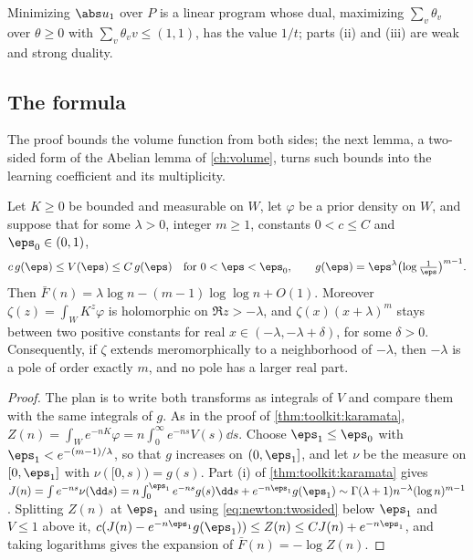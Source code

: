 \begin{refsection}
Minimizing $\abs u_1$ over $P$ is a linear program whose dual, maximizing $\sum_v\theta_v$ over $\theta\ge0$ with $\sum_v\theta_vv\le(1,1)$, has the value $1/t$; parts (ii) and (iii) are weak and strong duality.

\subsection{The formula}

The proof bounds the volume function from both sides; the next lemma, a two-sided form of the Abelian lemma of \cref{ch:volume}, turns such bounds into the learning coefficient and its multiplicity.

\begin{lemma}\label{lem:newton:bounds}
Let $K\ge0$ be bounded and measurable on $W$, let $\varphi$ be a prior density on $W$, and suppose that for some $\lambda>0$, integer $m\ge1$, constants $0<c\le C$ and $\eps_0\in(0,1)$,
\begin{equation}\label{eq:newton:twosided}
c\,g(\eps)\le V(\eps)\le C\,g(\eps)\quad\text{for }0<\eps<\eps_0,\qquad g(\eps)=\eps^\lambda\bigl(\log\tfrac1\eps\bigr)^{m-1}.
\end{equation}
Then $\bar F(n)=\lambda\log n-(m-1)\log\log n+O(1)$. Moreover $\zeta(z)=\int_WK^z\varphi$ is holomorphic on $\Re z>-\lambda$, and $\zeta(x)(x+\lambda)^m$ stays between two positive constants for real $x\in(-\lambda,-\lambda+\delta)$, for some $\delta>0$. Consequently, if $\zeta$ extends meromorphically to a neighborhood of $-\lambda$, then $-\lambda$ is a pole of order exactly $m$, and no pole has a larger real part.
\end{lemma}

\begin{proof}
The plan is to write both transforms as integrals of $V$ and compare them with the same integrals of $g$. As in the proof of \cref{thm:toolkit:karamata}, $Z(n)=\int_We^{-nK}\varphi=n\int_0^\infty e^{-ns}V(s)\dd s$. Choose $\eps_1\le\eps_0$ with $\eps_1<e^{-(m-1)/\lambda}$, so that $g$ increases on $(0,\eps_1]$, and let $\nu$ be the measure on $[0,\eps_1]$ with $\nu([0,s))=g(s)$. Part (i) of \cref{thm:toolkit:karamata} gives $J(n)=\int e^{-ns}\nu(\dd s)=n\int_0^{\eps_1}e^{-ns}g(s)\dd s+e^{-n\eps_1}g(\eps_1)\sim\Gamma(\lambda+1)n^{-\lambda}(\log n)^{m-1}$. Splitting $Z(n)$ at $\eps_1$ and using \eqref{eq:newton:twosided} below $\eps_1$ and $V\le1$ above it, $c(J(n)-e^{-n\eps_1}g(\eps_1))\le Z(n)\le CJ(n)+e^{-n\eps_1}$, and taking logarithms gives the expansion of $\bar F(n)=-\log Z(n)$.


\end{proof}
\end{refsection}
